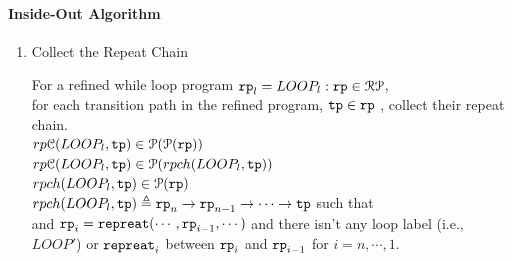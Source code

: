 \paragraph*{Inside-Out Algorithm}
\begin{enumerate}
\item {Collect the Repeat Chain}

For a refined while loop program $\mathtt{rp}_{l} = LOOP_l : \mathtt{rp} \in \mathcal{RP}$, 
\\
for each transition path in the refined program, $\mathtt{tp} \in \mathtt{rp}$ , 
collect their repeat chain.
\\
$rp\mathcal{C}(LOOP_l, \mathtt{tp}) \in \mathcal{P}(\mathcal{P}(\mathtt{rp}))$
\\
 $rp\mathcal{C}(LOOP_l, \mathtt{tp}) \in \mathcal{P}(rpch(LOOP_l, \mathtt{tp}))$
  \\
  $rpch(LOOP_l, \mathtt{tp}) \in \mathcal{P}(\mathtt{rp})$\\
  $rpch(LOOP_l, \mathtt{tp}) \triangleq \mathtt{rp}_n \to \mathtt{rp}_{n-1} \to \cdots \to \mathtt{tp} $
 such that \\
 and
 $\mathtt{rp}_{i}= \mathtt{repreat}(\cdots, \mathtt{rp}_{i - 1}, \cdots)$ and
 there isn't any loop label (i.e., $LOOP'$) or $\mathtt{repreat}_i$ between $\mathtt{rp}_{i}$ and $\mathtt{rp}_{i - 1}$ for $i = n, \cdots, 1$.

\end{enumerate}
